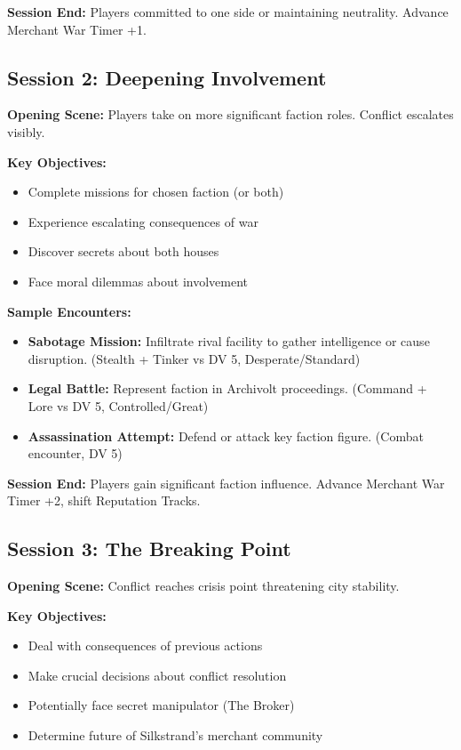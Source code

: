 \documentclass[11pt]{article}
\begin{document}
\textbf{Session End:} Players committed to one side or maintaining neutrality. Advance Merchant War Timer +1.

\subsection{Session 2: Deepening Involvement}

\textbf{Opening Scene:} Players take on more significant faction roles. Conflict escalates visibly.

\textbf{Key Objectives:}
\begin{itemize}
\item Complete missions for chosen faction (or both)
\item Experience escalating consequences of war
\item Discover secrets about both houses
\item Face moral dilemmas about involvement
\end{itemize}

\textbf{Sample Encounters:}
\begin{itemize}
\item \textbf{Sabotage Mission:} Infiltrate rival facility to gather intelligence or cause disruption. (Stealth + Tinker vs DV 5, Desperate/Standard)
\item \textbf{Legal Battle:} Represent faction in Archivolt proceedings. (Command + Lore vs DV 5, Controlled/Great)
\item \textbf{Assassination Attempt:} Defend or attack key faction figure. (Combat encounter, DV 5)
\end{itemize}

\textbf{Session End:} Players gain significant faction influence. Advance Merchant War Timer +2, shift Reputation Tracks.

\subsection{Session 3: The Breaking Point}

\textbf{Opening Scene:} Conflict reaches crisis point threatening city stability.

\textbf{Key Objectives:}
\begin{itemize}
\item Deal with consequences of previous actions
\item Make crucial decisions about conflict resolution
\item Potentially face secret manipulator (The Broker)
\item Determine future of Silkstrand's merchant community
\end{itemize}
\end{document}
